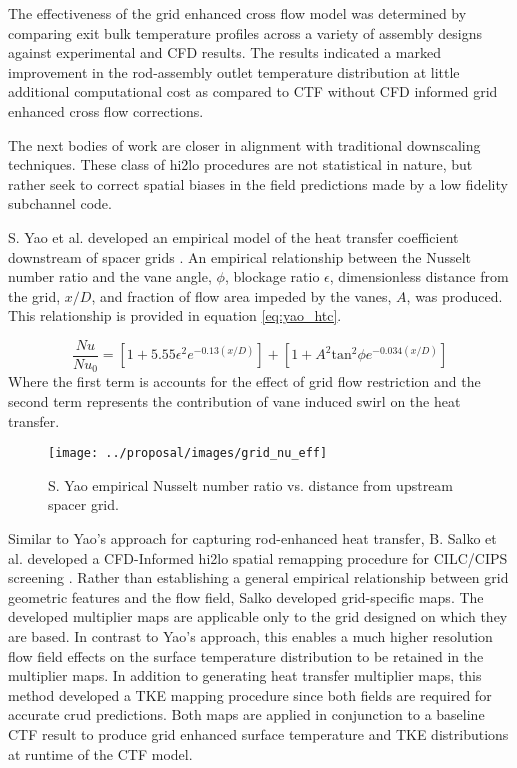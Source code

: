  The effectiveness of the grid enhanced cross flow model was determined by comparing exit bulk temperature profiles across a variety of assembly designs against experimental and CFD results.  The results indicated a marked improvement in the rod-assembly outlet temperature distribution at little additional computational cost as compared to CTF without CFD informed grid enhanced cross flow corrections.  
 
 The next bodies of work are closer in alignment with traditional downscaling techniques.  These class of hi2lo procedures are not statistical in nature, but rather seek to correct spatial biases in the field predictions made by a low fidelity subchannel code.

    
S. Yao et al. developed an empirical model of the heat transfer coefficient downstream of spacer grids \cite{yao82}.
    An empirical relationship between the Nusselt number ratio and the vane angle, $\phi$, blockage ratio $\epsilon$, dimensionless distance from the grid, $x/D$, and fraction of flow area impeded by the vanes, $A$, was produced.  This relationship is provided in equation \ref{eq:yao_htc}.
    
\begin{equation}
\frac{Nu}{Nu_0}  = \left[ 1 + 5.55 \epsilon^2 e^{-0.13(x/D)}\right] + \left[ 1 + A^2\mathrm{tan}^2\phi e^{-0.034(x/D)} \right]
\label{eq:yao_htc}
\end{equation}
Where the first term is accounts for the effect of grid flow restriction and the second term represents the contribution of vane induced swirl on the heat transfer.

\begin{figure}[H]
    \centering
    \texttt{[image: ../proposal/images/grid\_nu\_eff]}
    \caption{S. Yao empirical Nusselt number ratio vs. distance from upstream spacer grid.}
    \label{fig:gridnueff}
\end{figure}

    Similar to Yao's approach for capturing rod-enhanced heat transfer,  B. Salko et al. developed a CFD-Informed hi2lo spatial remapping procedure for CILC/CIPS screening \cite{salko17}.  Rather than establishing a general empirical relationship between grid geometric features and the flow field, Salko developed grid-specific maps.  The developed multiplier maps are applicable only to the grid designed on which they are based.  In contrast to Yao's approach, this enables a much higher resolution flow field effects on the surface temperature distribution to be retained in the multiplier maps.  In addition to generating heat transfer multiplier maps, this method developed a TKE mapping procedure since both fields are required for accurate crud predictions.  Both maps are applied in conjunction to a baseline CTF result to produce grid enhanced surface temperature and TKE distributions at runtime of the CTF model.
    
